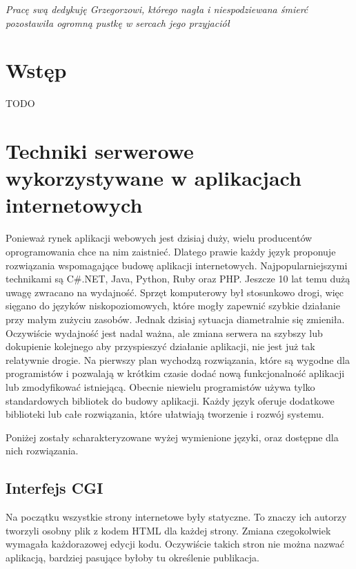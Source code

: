 \documentclass[a4paper,12pt,oneside]{report}
\begin{document}
\thispagestyle{empty}
\begin{flushright}
\vspace*{13cm}
\emph{Pracę swą dedykuję Grzegorzowi, którego nagła i niespodziewana śmierć pozostawiła ogromną pustkę w sercach jego przyjaciół}
\end{flushright}
\clearpage{}

\tableofcontents
\clearpage{}
\chapter{Wstęp}
\label{cha:wstep}

TODO

\chapter[Techniki po stronie serwera]{Techniki serwerowe wykorzystywane w aplikacjach internetowych}
\label{cha:serwer}

Ponieważ rynek aplikacji webowych jest dzisiaj duży, wielu producentów oprogramowania chce na nim zaistnieć. Dlatego prawie każdy język proponuje rozwiązania wspomagające budowę aplikacji internetowych. Najpopularniejszymi technikami są C\#.NET, Java, Python, Ruby oraz PHP. Jeszcze 10 lat temu dużą uwagę zwracano na wydajność. Sprzęt komputerowy był stosunkowo drogi, więc sięgano do języków niskopoziomowych, które mogły zapewnić szybkie działanie przy małym zużyciu zasobów. Jednak dzisiaj sytuacja diametralnie się zmieniła. Oczywiście wydajność jest nadal ważna, ale zmiana serwera na szybszy lub dokupienie kolejnego aby przyspieszyć działanie aplikacji, nie jest już tak relatywnie drogie. Na pierwszy plan wychodzą rozwiązania, które są wygodne dla programistów i pozwalają w krótkim czasie dodać nową funkcjonalność aplikacji lub zmodyfikować istniejącą. Obecnie niewielu programistów używa tylko standardowych bibliotek do budowy aplikacji. Każdy język oferuje dodatkowe biblioteki lub całe rozwiązania, które ułatwiają tworzenie i rozwój systemu. 

Poniżej zostały scharakteryzowane wyżej wymienione języki, oraz dostępne dla nich rozwiązania.

\section{Interfejs CGI}
\label{sec:cgi}
Na początku wszystkie strony internetowe były statyczne. To znaczy ich autorzy tworzyli osobny plik z kodem HTML dla każdej strony. Zmiana czegokolwiek wymagała każdorazowej edycji kodu. Oczywiście takich stron nie można nazwać aplikacją, bardziej pasujące byłoby tu określenie publikacja.
\end{document}

